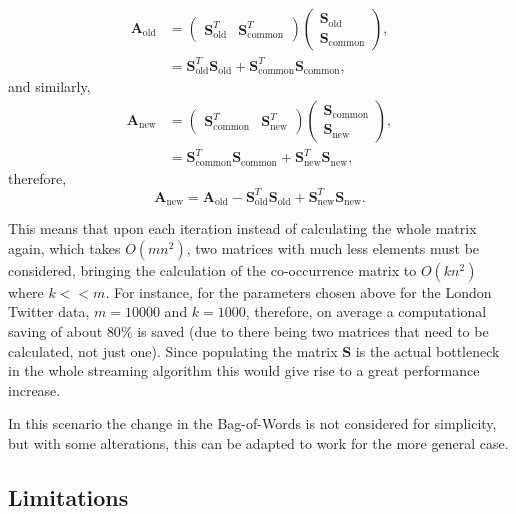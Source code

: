 \documentclass[11pt,a4paper]{article}
\newcommand{\smat}{\mathbf{S}}
\newcommand{\covmat}{\mathbf{A}}
\newcommand{\new}{_\text{new}}
\newcommand{\old}{_\text{old}}
\newcommand{\common}{_\text{common}}
\begin{document}
\begin{align*}
\covmat\old & = \left( \begin{matrix}
\smat\old^T & \smat\common^T
\end{matrix}\right)\left( \begin{matrix}
\smat\old \\ \smat\common
\end{matrix}\right),\\
& = 
\smat\old^T \smat\old+ \smat\common^T \smat\common,
\end{align*}
 and similarly, 
\begin{align*}
\covmat\new & = \left( \begin{matrix}
\smat\common^T & \smat\new^T
\end{matrix}\right)\left( \begin{matrix}
\smat\common \\ \smat\new
\end{matrix}\right),\\
& = 
\smat\common^T \smat\common+ \smat\new^T \smat\new,
\end{align*} 
therefore, 
\begin{equation}
\covmat\new = \covmat\old - \smat\old^T \smat\old + \smat\new^T\smat\new.
\end{equation}

This means that upon each iteration instead of calculating the whole matrix again, which takes $O(mn^2)$, two matrices with much less elements must be considered, bringing the calculation of the co-occurrence matrix to $O(kn^2)$ where $k << m$. For instance, for the parameters chosen above for the London Twitter data, $m = 10000$ and $k = 1000$, therefore, on average a computational saving of about $80\%$ is saved (due to there being two matrices that need to be calculated, not just one). Since populating the matrix $\smat$ is the actual bottleneck in the whole streaming algorithm this would give rise to a great performance increase. 

In this scenario the change in the Bag-of-Words is not considered for simplicity, but with some alterations, this can be adapted to work for the more general case.


\subsection{Limitations}
\end{document}

